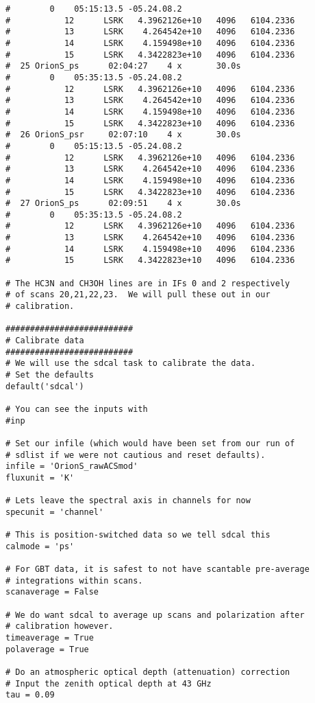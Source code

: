\begin{verbatim}
#        0    05:15:13.5 -05.24.08.2
#           12      LSRK   4.3962126e+10   4096   6104.2336
#           13      LSRK    4.264542e+10   4096   6104.2336
#           14      LSRK    4.159498e+10   4096   6104.2336
#           15      LSRK   4.3422823e+10   4096   6104.2336
#  25 OrionS_ps      02:04:27    4 x       30.0s
#        0    05:35:13.5 -05.24.08.2
#           12      LSRK   4.3962126e+10   4096   6104.2336
#           13      LSRK    4.264542e+10   4096   6104.2336
#           14      LSRK    4.159498e+10   4096   6104.2336
#           15      LSRK   4.3422823e+10   4096   6104.2336
#  26 OrionS_psr     02:07:10    4 x       30.0s
#        0    05:15:13.5 -05.24.08.2
#           12      LSRK   4.3962126e+10   4096   6104.2336
#           13      LSRK    4.264542e+10   4096   6104.2336
#           14      LSRK    4.159498e+10   4096   6104.2336
#           15      LSRK   4.3422823e+10   4096   6104.2336
#  27 OrionS_ps      02:09:51    4 x       30.0s
#        0    05:35:13.5 -05.24.08.2
#           12      LSRK   4.3962126e+10   4096   6104.2336
#           13      LSRK    4.264542e+10   4096   6104.2336
#           14      LSRK    4.159498e+10   4096   6104.2336
#           15      LSRK   4.3422823e+10   4096   6104.2336

# The HC3N and CH3OH lines are in IFs 0 and 2 respectively
# of scans 20,21,22,23.  We will pull these out in our
# calibration.

##########################
# Calibrate data
##########################
# We will use the sdcal task to calibrate the data.
# Set the defaults
default('sdcal')

# You can see the inputs with
#inp

# Set our infile (which would have been set from our run of
# sdlist if we were not cautious and reset defaults).
infile = 'OrionS_rawACSmod'
fluxunit = 'K'

# Lets leave the spectral axis in channels for now
specunit = 'channel'

# This is position-switched data so we tell sdcal this
calmode = 'ps'

# For GBT data, it is safest to not have scantable pre-average
# integrations within scans.
scanaverage = False

# We do want sdcal to average up scans and polarization after
# calibration however.
timeaverage = True
polaverage = True

# Do an atmospheric optical depth (attenuation) correction
# Input the zenith optical depth at 43 GHz
tau = 0.09


\end{verbatim}
